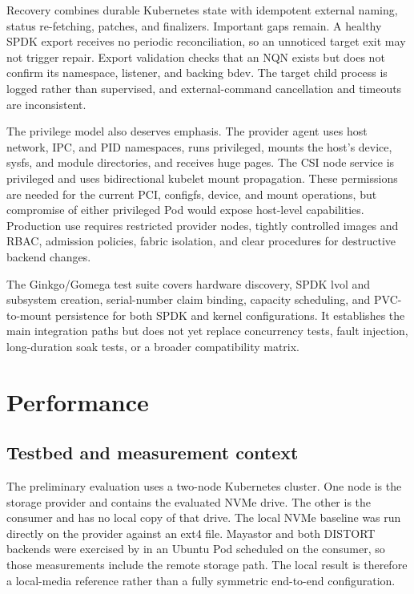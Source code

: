 \documentclass[10pt,a4paper,twocolumn]{article}
\newcommand{\distort}{DISTORT}
\newcommand{\code}[1]{\texttt{\detokenize{#1}}}
\begin{document}
Recovery combines durable Kubernetes state with idempotent external naming,
status re-fetching, patches, and finalizers. Important gaps remain. A healthy
SPDK export receives no periodic reconciliation, so an unnoticed target exit
may not trigger repair. Export validation checks that an NQN exists but does
not confirm its namespace, listener, and backing bdev. The target child process
is logged rather than supervised, and external-command cancellation and
timeouts are inconsistent.

The privilege model also deserves emphasis. The provider agent uses host
network, IPC, and PID namespaces, runs privileged, mounts the host's device,
sysfs, and module directories, and receives huge pages. The CSI node service is
privileged and uses bidirectional kubelet mount propagation. These permissions
are needed for the current PCI, configfs, device, and mount operations, but
compromise of either privileged Pod would expose host-level capabilities.
Production use requires restricted provider nodes, tightly controlled images
and RBAC, admission policies, fabric isolation, and clear procedures for
destructive backend changes.

The Ginkgo/Gomega test suite covers hardware discovery, SPDK lvol and subsystem
creation, serial-number claim binding, capacity scheduling, and PVC-to-mount
persistence for both SPDK and kernel configurations. It establishes the main
integration paths but does not yet replace concurrency tests, fault injection,
long-duration soak tests, or a broader compatibility matrix.

\section{Performance}

\subsection{Testbed and measurement context}

The preliminary evaluation uses a two-node Kubernetes cluster. One node is the
storage provider and contains the evaluated NVMe drive. The other is the
consumer and has no local copy of that drive. The local NVMe baseline was run
directly on the provider against an ext4 file. Mayastor and both \distort{}
backends were exercised by \code{fio} in an Ubuntu Pod scheduled on the
consumer, so those measurements include the remote storage path. The local
result is therefore a local-media reference rather than a fully symmetric
end-to-end configuration.
\end{document}
